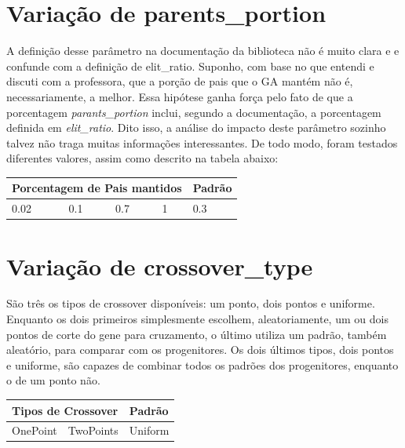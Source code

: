 \documentclass[12pt]{article}
\begin{document}
\section{Variação de parents\_portion}

A definição desse parâmetro na documentação da biblioteca não é muito clara e e confunde com a definição de elit\_ratio. Suponho, com base no que entendi e discuti com a professora, que a porção de pais que o GA mantém não é, necessariamente, a melhor. Essa hipótese ganha força pelo fato de que a porcentagem \textit{parants\_portion} inclui, segundo a documentação, a porcentagem definida em \textit{elit\_ratio}. Dito isso, a análise do impacto deste parâmetro sozinho talvez não traga muitas informações interessantes. De todo modo, foram testados diferentes valores, assim como descrito na tabela abaixo:

\begin{table}[H]
	\centering
	\begin{tabular}{|l|l|l|l|l|}
		\hline
		\multicolumn{4}{|l|}{Porcentagem de Pais mantidos} & Padrão \\ \hline
		0.02    & 0.1    & 0.7    & 1   &0.3 \\ \hline
	\end{tabular}
\end{table}

\section{Variação de crossover\_type}

São três os tipos de crossover disponíveis: um ponto, dois pontos e uniforme. Enquanto os dois primeiros simplesmente escolhem, aleatoriamente, um ou dois pontos de corte do gene para cruzamento, o último utiliza um padrão, também aleatório, para comparar com os progenitores. Os dois últimos tipos, dois pontos e uniforme, são capazes de combinar todos os padrões dos progenitores, enquanto o de um ponto não.

\begin{table}[H]
	\centering
	\begin{tabular}{|l|l|l|}
		\hline
		\multicolumn{2}{|l|}{Tipos de Crossover}&Padrão \\ \hline
		OnePoint    & TwoPoints    & Uniform    \\ \hline
	\end{tabular}
\end{table}
	
	 
	
\end{document}
